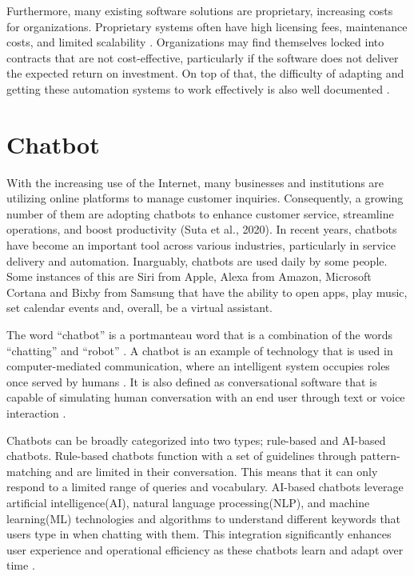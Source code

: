 Furthermore, many existing software solutions are proprietary, increasing costs for organizations. Proprietary systems often have high licensing fees, maintenance costs, and limited scalability \cite{goel2012, prasad2013}. Organizations may find themselves locked into contracts that are not cost-effective, particularly if the software does not deliver the expected return on investment. On top of that, the difficulty of adapting and getting these automation systems to work effectively is also well documented \cite{adams2011, sarker2003, scott2000}.


\section{Chatbot}

With the increasing use of the Internet, many businesses and institutions are utilizing online platforms to manage customer inquiries. Consequently, a growing number of them are adopting chatbots to enhance customer service, streamline operations, and boost productivity (Suta et al., 2020). In recent years, chatbots have become an important tool across various industries, particularly in service delivery and automation. Inarguably, chatbots are used daily by some people. Some instances of this are Siri from Apple, Alexa from Amazon, Microsoft Cortana and Bixby from Samsung that have the ability to open apps, play music, set calendar events and, overall, be a virtual assistant.

The word “chatbot” is a portmanteau word that is a combination of the words “chatting” and “robot” \cite{rese2020}. A chatbot is an example of technology that is used in computer-mediated communication, where an intelligent system occupies roles once served by humans \cite{beattie2020}. It is also defined as conversational software that is capable of simulating human conversation with an end user through text or voice interaction \cite{Naruzzaman}.

Chatbots can be broadly categorized into two types; rule-based and AI-based chatbots. Rule-based chatbots function with a set of guidelines through pattern-matching and are limited in their conversation. This means that it can only respond to a limited range of queries and vocabulary. AI-based chatbots leverage artificial intelligence(AI), natural language processing(NLP), and machine learning(ML) technologies and algorithms to understand different keywords that users type in when chatting with them. This integration significantly enhances user experience and operational efficiency as these chatbots learn and adapt over time \cite{Kar2016}.

